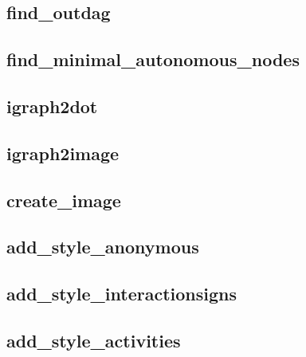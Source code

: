 \documentclass[letterpaper,10pt,english]{sphinxmanual}
\begin{document}
\subsection{find\_outdag}
\label{\detokenize{InteractionGraphs:find-outdag}}\label{\detokenize{InteractionGraphs:id3}}

\subsection{find\_minimal\_autonomous\_nodes}
\label{\detokenize{InteractionGraphs:find-minimal-autonomous-nodes}}\label{\detokenize{InteractionGraphs:id4}}

\subsection{igraph2dot}
\label{\detokenize{InteractionGraphs:id5}}\label{\detokenize{InteractionGraphs:igraph2dot}}

\subsection{igraph2image}
\label{\detokenize{InteractionGraphs:id6}}\label{\detokenize{InteractionGraphs:igraph2image}}

\subsection{create\_image}
\label{\detokenize{InteractionGraphs:igs-create-image}}\label{\detokenize{InteractionGraphs:create-image}}

\subsection{add\_style\_anonymous}
\label{\detokenize{InteractionGraphs:id7}}\label{\detokenize{InteractionGraphs:add-style-anonymous}}

\subsection{add\_style\_interactionsigns}
\label{\detokenize{InteractionGraphs:add-style-interactionsigns}}\label{\detokenize{InteractionGraphs:id8}}

\subsection{add\_style\_activities}
\label{\detokenize{InteractionGraphs:add-style-activities}}\label{\detokenize{InteractionGraphs:id9}}
\end{document}
